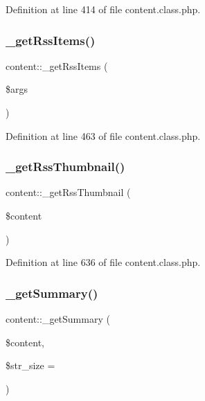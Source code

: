 Definition at line 414 of file content.\+class.\+php.

\hypertarget{classcontent_aa541a575f915fc5fddbd5075a545d991}{}\label{classcontent_aa541a575f915fc5fddbd5075a545d991} 
\subsubsection{\texorpdfstring{\+\_\+get\+Rss\+Items()}{\_getRssItems()}}
{\footnotesize\ttfamily content\+::\+\_\+get\+Rss\+Items (\begin{DoxyParamCaption}\item[{}]{\$args }\end{DoxyParamCaption})}



Definition at line 463 of file content.\+class.\+php.

\hypertarget{classcontent_afe1cfad315cf8f3aeb352b22d0020142}{}\label{classcontent_afe1cfad315cf8f3aeb352b22d0020142} 
\subsubsection{\texorpdfstring{\+\_\+get\+Rss\+Thumbnail()}{\_getRssThumbnail()}}
{\footnotesize\ttfamily content\+::\+\_\+get\+Rss\+Thumbnail (\begin{DoxyParamCaption}\item[{}]{\$content }\end{DoxyParamCaption})}



Definition at line 636 of file content.\+class.\+php.

\hypertarget{classcontent_ae3e4dc54c21e3ac9eb67d547d914661a}{}\label{classcontent_ae3e4dc54c21e3ac9eb67d547d914661a} 
\subsubsection{\texorpdfstring{\+\_\+get\+Summary()}{\_getSummary()}}
{\footnotesize\ttfamily content\+::\+\_\+get\+Summary (\begin{DoxyParamCaption}\item[{}]{\$content,  }\item[{}]{\$str\+\_\+size = {} }\end{DoxyParamCaption})}



